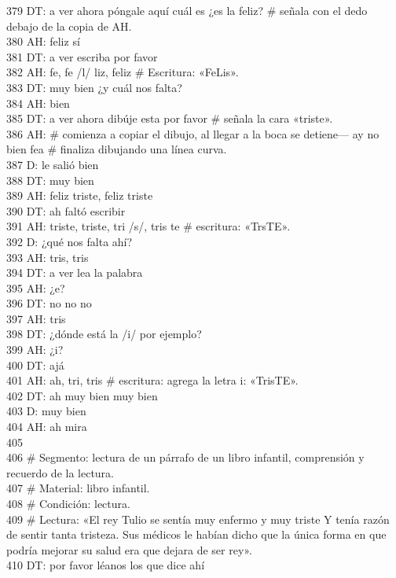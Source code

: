 379 DT: a ver ahora póngale aquí cuál es ¿es la feliz? \# señala con el dedo debajo de la copia de AH.\\
380 AH: feliz sí\\
381 DT: a ver escriba por favor\\
382 AH: fe, fe /l/ liz, feliz \# Escritura: «FeLis».\\
383 DT: muy bien ¿y cuál nos falta?\\
384 AH: bien\\
385 DT: a ver ahora dibúje esta por favor \# señala la cara «triste».\\
386 AH: \# comienza a copiar el dibujo, al llegar a la boca se detiene--- ay no bien fea \# finaliza dibujando una línea curva.\\
387 D: le salió bien\\
388 DT: muy bien\\
389 AH: feliz triste, feliz triste\\
390 DT: ah faltó escribir\\
391 AH: triste, triste, tri /s/, tris te \# escritura: «TrsTE».\\
392 D: ¿qué nos falta ahí?\\
393 AH: tris, tris\\
394 DT: a ver lea la palabra\\
395 AH: ¿e?\\
396 DT: no no no\\
397 AH: tris\\
398 DT: ¿dónde está la /i/ por ejemplo?\\
399 AH: ¿i?\\
400 DT: ajá\\
401 AH: ah, tri, tris \# escritura: agrega la letra i: «TrisTE».\\
402 DT: ah muy bien muy bien\\
403 D: muy bien\\
404 AH: ah mira\\
405 \\
406 \# Segmento: lectura de un párrafo de un libro infantil, comprensión y recuerdo de la lectura.\\
407 \# Material: libro infantil.\\
408 \# Condición: lectura.\\
409 \# Lectura: «El rey Tulio se sentía muy enfermo y muy triste Y tenía razón de sentir tanta tristeza. Sus médicos le habían dicho que la única forma en que podría mejorar su salud era que dejara de ser rey».\\
410 DT: por favor léanos los que dice ahí\\
